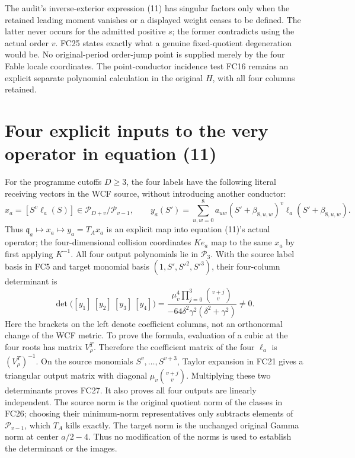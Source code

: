 The audit's inverse-exterior expression (11) has singular factors only
when the retained leading moment vanishes or a displayed weight ceases
to be defined. The latter never occurs for the admitted positive $s$;
the former contradicts using the actual order $v$. FC25 states exactly
what a genuine fixed-quotient degeneration would be. No original-period
order-jump point is supplied merely by the four Fable locale coordinates.
The point-conductor incidence test FC16 remains an explicit separate
polynomial calculation in the original $H$, with all four columns retained.

\section{Four explicit inputs to the very operator in equation (11)}
For the programme cutoffs $D\ge3$, the four labels have the following
literal receiving vectors in the WCF source, without introducing another
conductor:
\[
 x_a=[S^v\ell_a(S)]\in\mathcal P_{D+v}/\mathcal P_{v-1},\qquad
 y_a(S')=\sum_{u,w=0}^8 a_{uw}
 (S'+\beta_{8,u,w})^v\ell_a(S'+\beta_{8,u,w}).
 \tag{FC26}
\]
Thus $\mathfrak q_a\mapsto x_a\mapsto y_a=T_Ax_a$ is an explicit
map into equation (11)'s actual operator; the four-dimensional collision
coordinates $Ke_a$ map to the same $x_a$ by first applying $K^{-1}$.
All four output polynomials lie in $\mathcal P_3$.
With the source label basis in FC5 and target monomial basis
$(1,S',S'^2,S'^3)$, their four-column determinant is
\[
 \det\bigl([y_1]\ [y_2]\ [y_3]\ [y_4]\bigr)
 =\frac{\mu_v^4\displaystyle\prod_{j=0}^3\binom{v+j}{v}}
 {-64\delta^2\gamma^2(\delta^2+\gamma^2)}\ne0.
 \tag{FC27}
\]
Here the brackets on the left denote coefficient columns, not an
orthonormal change of the WCF metric. To prove the formula, evaluation
of a cubic at the four roots has matrix $V_\rho^T$. Therefore the
coefficient matrix of the four $\ell_a$ is $(V_\rho^T)^{-1}$.
On the source monomials $S^v,\ldots,S^{v+3}$, Taylor expansion in
FC21 gives a triangular output matrix with diagonal
$\mu_v\binom{v+j}{v}$. Multiplying these two determinants proves
FC27. It also proves all four outputs are linearly independent. The
source norm is the original quotient norm of the classes in FC26;
choosing their minimum-norm representatives only subtracts elements of
$\mathcal P_{v-1}$, which $T_A$ kills exactly. The target norm is the
unchanged original Gamma norm at center $a/2-4$. Thus no modification
of the norms is used to establish the determinant or the images.

